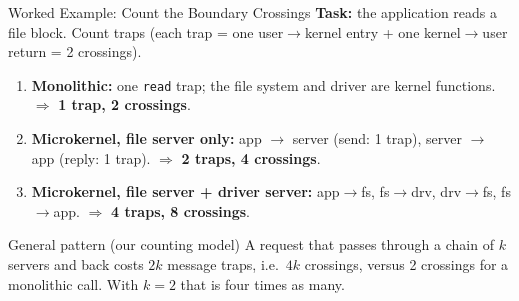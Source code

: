 \documentclass[aspectratio=169]{beamer}
\begin{document}
\begin{frame}{Worked Example: Count the Boundary Crossings}
  \small
  \textbf{Task:} the application reads a file block. Count traps (each trap =
  one user$\to$kernel entry + one kernel$\to$user return = 2 crossings).
  \vspace{0.1cm}
  \begin{enumerate}
    \item \textbf{Monolithic:} one \texttt{read} trap; the file system and
      driver are kernel functions. $\Rightarrow$ \textbf{1 trap, 2 crossings}.
    \item \textbf{Microkernel, file server only:} app $\to$ server (send: 1
      trap), server $\to$ app (reply: 1 trap). $\Rightarrow$ \textbf{2 traps,
      4 crossings}.
    \item \textbf{Microkernel, file server + driver server:} app$\to$fs,
      fs$\to$drv, drv$\to$fs, fs$\to$app. $\Rightarrow$ \textbf{4 traps,
      8 crossings}.
  \end{enumerate}
  \vspace{0.1cm}
  \begin{exampleblock}{General pattern (our counting model)}
    A request that passes through a chain of $k$ servers and back costs $2k$
    message traps, i.e.\ $4k$ crossings, versus 2 crossings for a monolithic
    call. With $k=2$ that is four times as many.
  \end{exampleblock}
\end{frame}
\end{document}
